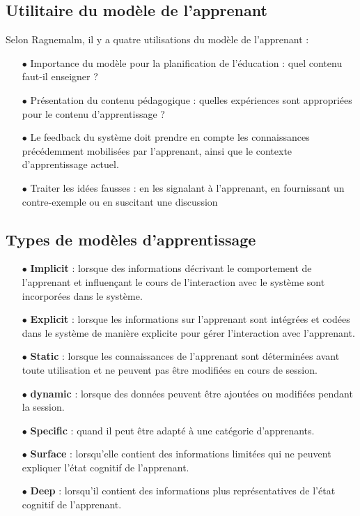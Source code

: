 \subsection{Utilitaire du modèle de l'apprenant}
Selon Ragnemalm, il y a quatre utilisations du modèle de l’apprenant : \cite{inproceedings}
\begin{itemize}
	\item[$\bullet$] Importance du modèle pour la planification de l’éducation : quel contenu faut-il enseigner ?
	\item[$\bullet$] Présentation du contenu pédagogique : quelles expériences sont appropriées pour le contenu d’apprentissage ?
	\item[$\bullet$] Le feedback du système doit prendre en compte les connaissances précédemment mobilisées par l'apprenant, ainsi que le contexte d'apprentissage actuel.
	\item[$\bullet$] Traiter les idées fausses : en les signalant à l'apprenant, en fournissant un contre-exemple ou en suscitant une discussion
\end{itemize}

\subsection{Types de modèles d'apprentissage}
\begin{itemize}
	\item[$\bullet$] \textbf{Implicit} : lorsque des informations décrivant le comportement de l'apprenant et influençant le cours de l'interaction avec le système sont incorporées dans le système.
	\item[$\bullet$] \textbf{Explicit} : lorsque les informations sur l'apprenant sont intégrées et codées dans le système de manière explicite pour gérer l'interaction avec l'apprenant.
	\item[$\bullet$] \textbf{Static} : lorsque les connaissances de l'apprenant sont déterminées avant toute utilisation et ne peuvent pas être modifiées en cours de session.
	\item[$\bullet$] \textbf{dynamic} : lorsque des données peuvent être ajoutées ou modifiées pendant la session.
	\item[$\bullet$] \textbf{Specific} : quand il peut être adapté à une catégorie d'apprenants.
	\item[$\bullet$] \textbf{Surface} : lorsqu'elle contient des informations limitées qui ne peuvent expliquer l'état cognitif de l'apprenant.
	\item[$\bullet$] \textbf{Deep} : lorsqu'il contient des informations plus représentatives de l'état cognitif de l'apprenant. \cite{state_student_modelling}
\end{itemize}

